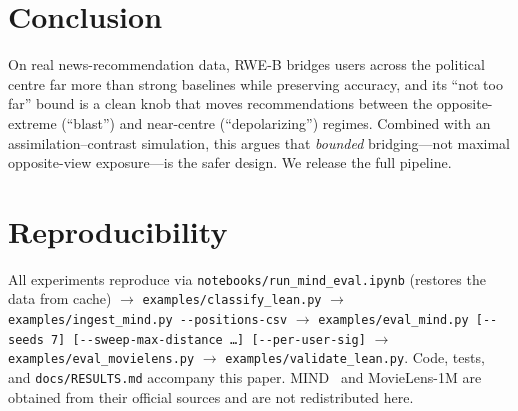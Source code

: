 \documentclass[sigconf,nonacm]{acmart}
\begin{document}
\section{Conclusion}
On real news-recommendation data, RWE-B bridges users across the political centre
far more than strong baselines while preserving accuracy, and its ``not too far''
bound is a clean knob that moves recommendations between the opposite-extreme
(``blast'') and near-centre (``depolarizing'') regimes. Combined with an
assimilation--contrast simulation, this argues that \emph{bounded} bridging---not
maximal opposite-view exposure---is the safer design. We release the full
pipeline.

\section*{Reproducibility}
All experiments reproduce via \texttt{notebooks/run\_mind\_eval.ipynb}
(restores the data from cache) $\to$ \texttt{examples/classify\_lean.py} $\to$
\texttt{examples/ingest\_mind.py -{}-positions-csv} $\to$
\texttt{examples/eval\_mind.py [-{}-seeds 7] [-{}-sweep-max-distance \ldots]
[-{}-per-user-sig]} $\to$ \texttt{examples/eval\_movielens.py} $\to$
\texttt{examples/validate\_lean.py}. Code, tests, and \texttt{docs/RESULTS.md}
accompany this paper. MIND~\cite{wu2020mind} and MovieLens-1M
\cite{harper2015movielens} are obtained from their official sources and are not
redistributed here.



\end{document}
